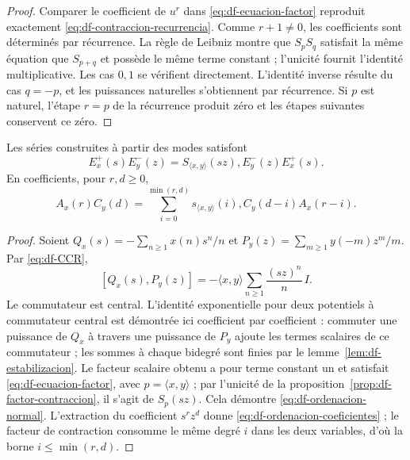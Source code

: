 \begin{proof}
Comparer le coefficient de \(u^r\) dans \eqref{eq:df-ecuacion-factor} reproduit exactement \eqref{eq:df-contraccion-recurrencia}. Comme \(r+1\ne0\), les coefficients sont déterminés par récurrence. La règle de Leibniz montre que \(S_pS_q\) satisfait la même équation que \(S_{p+q}\) et possède le même terme constant ; l’unicité fournit l’identité multiplicative. Les cas \(0,1\) se vérifient directement. L’identité inverse résulte du cas \(q=-p\), et les puissances naturelles s’obtiennent par récurrence. Si \(p\) est naturel, l’étape \(r=p\) de la récurrence produit zéro et les étapes suivantes conservent ce zéro.
\end{proof}

\begin{theorem}
\label{thm:df-ordenacion} Les séries construites à partir des modes satisfont
\begin{equation}
 E^+_x(s)E^-_y(z)
 =S_{\langle x,y\rangle}(sz),E^-_y(z)E^+_x(s).
 \label{eq:df-ordenacion-normal}
\end{equation}
En coefficients, pour \(r,d\geq0\),
\begin{equation}
 A_x(r)C_y(d)
 =\sum_{i=0}^{\min(r,d)}
 s_{\langle x,y\rangle}(i),
 C_y(d-i)A_x(r-i).
 \label{eq:df-ordenacion-coeficientes}
\end{equation}
\end{theorem}

\begin{proof}
Soient \(Q_x(s)=-\sum_{n\geq1}x(n)s^n/n\) et \(P_y(z)=\sum_{m\geq1}y(-m)z^m/m\). Par \eqref{eq:df-CCR},
\[
 [Q_x(s),P_y(z)]
 =-\langle x,y\rangle\sum_{n\geq1}\frac{(sz)^n}{n}\,I.
\]
Le commutateur est central. L’identité exponentielle pour deux potentiels à commutateur central est démontrée ici coefficient par coefficient : commuter une puissance de \(Q_x\) à travers une puissance de \(P_y\) ajoute les termes scalaires de ce commutateur ; les sommes à chaque bidegré sont finies par le lemme~\ref{lem:df-estabilizacion}. Le facteur scalaire obtenu a pour terme constant un et satisfait \eqref{eq:df-ecuacion-factor}, avec \(p=\langle x,y\rangle\) ; par l’unicité de la proposition~\ref{prop:df-factor-contraccion}, il s’agit de \(S_p(sz)\). Cela démontre \eqref{eq:df-ordenacion-normal}. L’extraction du coefficient \(s^rz^d\) donne \eqref{eq:df-ordenacion-coeficientes} ; le facteur de contraction consomme le même degré \(i\) dans les deux variables, d’où la borne \(i\leq\min(r,d)\).
\end{proof}

